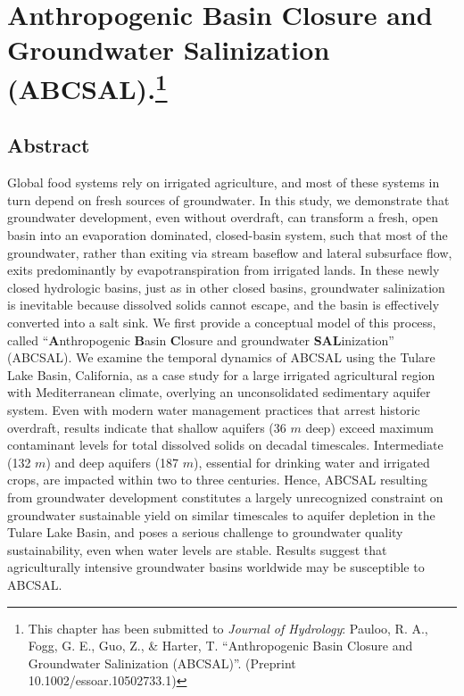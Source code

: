 
\chapter[Anthropogenic Basin Closure and Groundwater Salinization (ABCSAL)]{Anthropogenic Basin Closure and Groundwater Salinization (ABCSAL).\footnote[1]{This chapter has been submitted to \textit{Journal of Hydrology}: Pauloo, R. A., Fogg, G. E., Guo, Z., \& Harter, T. ``Anthropogenic Basin Closure and Groundwater Salinization (ABCSAL)''. (Preprint 10.1002/essoar.10502733.1)}}

\section{Abstract}

\noindent Global food systems rely on irrigated agriculture, and most of these systems in turn depend on fresh sources of groundwater. In this study, we demonstrate that groundwater development, even without overdraft, can transform a fresh, open basin into an evaporation dominated, closed-basin system, such that most of the groundwater, rather than exiting via stream baseflow and lateral subsurface flow, exits predominantly by evapotranspiration from irrigated lands. In these newly closed hydrologic basins, just as in other closed basins, groundwater salinization is inevitable because dissolved solids cannot escape, and the basin is effectively converted into a salt sink. We first provide a conceptual model of this process, called ``\textbf{A}nthropogenic \textbf{B}asin \textbf{C}losure and groundwater \textbf{SAL}inization'' (ABCSAL). We examine the temporal dynamics of ABCSAL using the Tulare Lake Basin, California, as a case study for a large irrigated agricultural region with Mediterranean climate, overlying an unconsolidated sedimentary aquifer system. Even with modern water management practices that arrest historic overdraft, results indicate that shallow aquifers (36 $m$ deep) exceed maximum contaminant levels for total dissolved solids on decadal timescales. Intermediate (132 $m$) and deep aquifers (187 $m$), essential for drinking water and irrigated crops, are impacted within two to three centuries. Hence, ABCSAL resulting from groundwater development constitutes a largely unrecognized constraint on groundwater sustainable yield on similar timescales to aquifer depletion in the Tulare Lake Basin, and poses a serious challenge to groundwater quality sustainability, even when water levels are stable. Results suggest that agriculturally intensive groundwater basins worldwide may be susceptible to ABCSAL.

